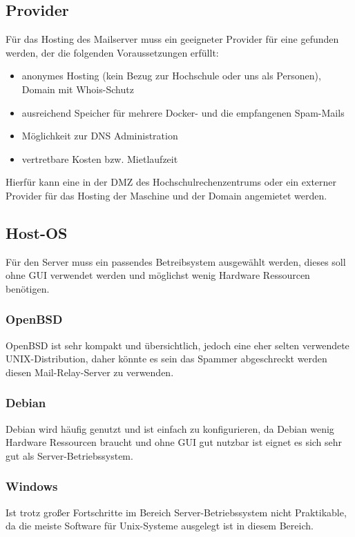 \documentclass[a4paper,11pt,singlespacing]{article}
\begin{document}
	\subsection{Provider}\label{sec:Provider}
		Für das Hosting des Mailserver  muss ein geeigneter Provider für eine  gefunden werden, der die folgenden Voraussetzungen erfüllt:
		\begin{itemize}
		    \item anonymes Hosting (kein Bezug zur Hochschule oder uns als Personen), Domain mit Whois-Schutz
			\item ausreichend Speicher für mehrere Docker- und die empfangenen Spam-Mails
			\item Möglichkeit zur DNS Administration
			\item vertretbare Kosten bzw. Mietlaufzeit
		\end{itemize}
		
		Hierfür kann eine  in der DMZ des Hochschulrechenzentrums oder ein externer Provider für das Hosting der Maschine und der Domain angemietet werden.

	\subsection{Host-OS}\label{sec:Host-Maschine}
		Für den Server muss ein passendes Betreibsystem ausgewählt werden, dieses soll ohne GUI verwendet werden und möglichst wenig Hardware Ressourcen benötigen.
		\subsubsection{OpenBSD}\label{sec:OpenBSD}
			OpenBSD ist sehr kompakt und übersichtlich, jedoch eine eher selten verwendete UNIX-Distribution, daher könnte es sein das Spammer abgeschreckt werden diesen Mail-Relay-Server zu verwenden.
		\subsubsection{Debian}\label{sec:Debian}
			Debian wird häufig genutzt und ist einfach zu konfigurieren, da Debian wenig Hardware Ressourcen braucht und ohne GUI gut nutzbar ist eignet es sich sehr gut als Server-Betriebssystem.
		\subsubsection{Windows}\label{sec:Windows}
			Ist trotz großer Fortschritte im Bereich Server-Betriebssystem nicht Praktikable, da die meiste Software für Unix-Systeme ausgelegt ist in diesem Bereich.
\end{document}
